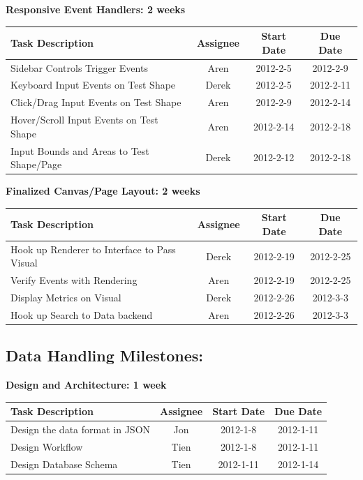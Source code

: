 \documentclass[12pt, letterpaper]{article}
\begin{document}
  \begin{center}
		{\bf Responsive Event Handlers: 2 weeks}
    \begin{tabular}{| l || c | c | c | }
      \hline
      Task Description & Assignee & Start Date & Due Date \\
      \hline
 	    Sidebar Controls Trigger Events & Aren & 2012-2-5 & 2012-2-9 \\
	    Keyboard Input Events on Test Shape & Derek & 2012-2-5 & 2012-2-11 \\
	    Click/Drag Input Events on Test Shape & Aren & 2012-2-9 & 2012-2-14 \\
	    Hover/Scroll Input Events on Test Shape & Aren & 2012-2-14 & 2012-2-18 \\
	    Input Bounds and Areas to Test Shape/Page & Derek & 2012-2-12 & 2012-2-18 \\
      \hline
    \end{tabular}
  \end{center}

  \begin{center}
		{\bf Finalized Canvas/Page Layout: 2 weeks}
    \begin{tabular}{| l || c | c | c | }
      \hline
      Task Description & Assignee & Start Date & Due Date \\
      \hline
	    Hook up Renderer to Interface to Pass Visual & Derek & 2012-2-19 & 2012-2-25 \\
	    Verify Events with Rendering & Aren & 2012-2-19 & 2012-2-25 \\
	    Display Metrics on Visual & Derek & 2012-2-26 & 2012-3-3 \\
	    Hook up Search to Data backend & Aren & 2012-2-26 & 2012-3-3 \\
      \hline
    \end{tabular}
  \end{center}

  	\subsection{Data Handling Milestones:}

  \begin{center}
		{\bf Design and Architecture: 1 week}
    \begin{tabular}{| l || c | c | c | }
      \hline
      Task Description & Assignee & Start Date & Due Date \\
      \hline
	    Design the data format in JSON & Jon & 2012-1-8 & 2012-1-11 \\
	    Design Workflow & Tien & 2012-1-8 & 2012-1-11 \\
	    Design Database Schema & Tien & 2012-1-11 & 2012-1-14 \\    
      \hline
    \end{tabular}
  \end{center}
\end{document}
